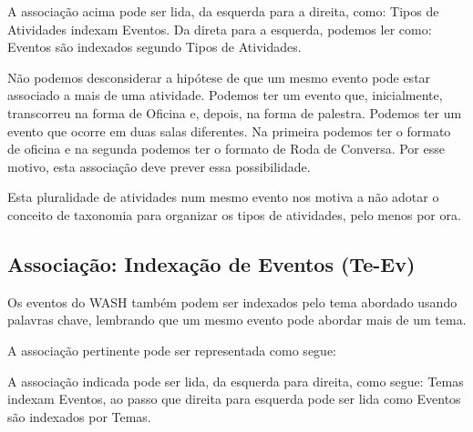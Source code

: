 \documentclass[
12pt,		%
openright,	%
twoside,  %
a4paper,			%
chapter=TITLE,		%
english,			%
french,				%
spanish,			%
brazil				%
]{USPSC-classe/USPSC}
\begin{document}
A associa\c{c}\~ao acima pode ser lida, da esquerda para a direita, como: \textquotedbl Tipos de Atividades indexam Eventos\textquotedbl . Da direta para a esquerda, podemos ler como: \textquotedbl Eventos s\~ao indexados segundo Tipos de Atividades\textquotedbl .




N\~ao podemos desconsiderar a hip\'otese de que um mesmo evento pode estar associado a mais de uma atividade. Podemos ter um evento que, inicialmente, transcorreu na forma de Oficina e, depois, na forma de palestra. Podemos ter um evento que ocorre em duas salas diferentes. Na primeira podemos ter o formato de oficina e na segunda podemos ter o formato de Roda de Conversa. Por esse motivo, esta associa\c{c}\~ao deve prever essa possibilidade.




Esta pluralidade de atividades num mesmo evento nos motiva a n\~ao adotar o conceito de taxonomia para organizar os tipos de atividades, pelo menos por ora.




\subsection[Associa\c{c}\~ao: Indexa\c{c}\~ao de Eventos (Te-Ev)]{Associa\c{c}\~ao: Indexa\c{c}\~ao de Eventos (Te-Ev)}\label{Associa\c{c}\~ao: Indexa\c{c}\~ao de Eventos (Te-Ev)}
Os eventos do WASH tamb\'em podem ser indexados pelo tema abordado usando palavras chave, lembrando que um mesmo evento pode abordar mais de um tema.




A associa\c{c}\~ao pertinente pode ser representada como segue:






A associa\c{c}\~ao indicada pode ser lida, da esquerda para direita, como segue: \textquotedbl Temas indexam Eventos\textquotedbl , ao passo que direita para  esquerda pode ser lida como \textquotedbl Eventos s\~ao indexados por Temas\textquotedbl .
\end{document}
